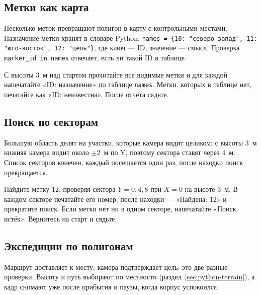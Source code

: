 \subsection{Метки как карта}

Несколько меток превращают полигон в карту с контрольными местами. Назначение метки хранят в словаре Python: \verb|names = {10: "северо-запад", 11: "юго-восток", 12: "цель"}|, где ключ --- ID, значение --- смысл. Проверка \verb|marker_id in names| отвечает, есть ли такой ID в таблице.

\begin{taskbox}
С высоты 3~м над стартом прочитайте все видимые метки и для каждой напечатайте «ID: назначение» по таблице \verb|names|. Метки, которых в таблице нет, печатайте как «ID: неизвестна». После отчёта сядьте.
\end{taskbox}

\subsection{Поиск по секторам}

Большую область делят на участки, которые камера видит целиком: с высоты 3~м нижняя камера видит около $\pm2$~м по Y, поэтому сектора ставят через 4~м. Список секторов конечен, каждый посещается один раз, после находки поиск прекращается.

\begin{taskbox}
Найдите метку 12, проверяя сектора $Y = 0, 4, 8$ при $X = 0$ на высоте 3~м. В каждом секторе печатайте его номер; после находки --- «Найдена: 12» и прекратите поиск. Если метки нет ни в одном секторе, напечатайте «Поиск истёк». Вернитесь на старт и сядьте.
\end{taskbox}

\subsection{Экспедиции по полигонам}

Маршрут доставляет к месту, камера подтверждает цель: это две разные проверки. Высоту и путь выбирают по местности (раздел~\ref{sec:python-terrain}), а кадр снимают уже после прибытия и паузы, когда корпус успокоился.

